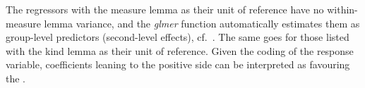 The regressors with the measure lemma as their unit of reference have no within-measure lemma variance, and the \textit{glmer} function automatically estimates them as group-level predictors (second-level effects), cf.\ \citet[265--269,302--304]{GelmanHill2006}.
The same goes for those listed with the kind lemma as their unit of reference.
Given the coding of the response variable, coefficients leaning to the positive side can be interpreted as favouring the \PGCa.

\begin{table}
  \centering
\end{table}
